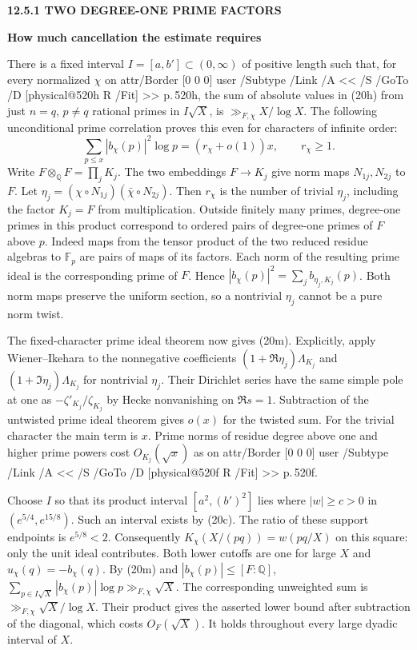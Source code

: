 \documentclass[11pt,letterpaper]{article}
\makeatletter
\newcommand{\rightmarktext}{}
\newcommand{\printfolio}{}
\newcommand{\leaf}[4]{\clearpage\gdef\printfolio{#1}\gdef\rightmarktext{#2}%
  {\small\sffamily\bfseries\color{ink}#3\par}\vspace{3pt}%
  {\LARGE\bfseries #4\par}\vspace{5pt}}
\newcommand{\Q}{\mathbb Q}
\newcommand{\MusicPDFPageRef}[1]{\pdfpageref\csname physical@#1\endcsname\space\space 0 R}
\newcommand{\pagelink}[2]{\leavevmode\pdfstartlink attr{/Border [0 0 0]} user{%
  /Subtype /Link /A << /S /GoTo /D [\MusicPDFPageRef{#1} /Fit] >>}%
  {\color{ink}#2}\pdfendlink}
\newcommand{\pg}[1]{\pagelink{#1}{p.\,#1}}
\makeatother
\begin{document}
\leaf{520i}{The absolute prime contribution}{12.5.1 \quad TWO DEGREE-ONE PRIME FACTORS}{How much cancellation the estimate requires}
There is a fixed interval $I=[a,b']\subset(0,\infty)$ of positive
length such that, for every normalized $\chi$ on \pg{520h}, the sum of
absolute values in (20h) from just $n=q$, $p\ne q$ rational primes in
$I\sqrt X$, is $\gg_{F,\chi} X/\log X$. The following unconditional
prime correlation proves this even for characters of infinite order:
\[
   \sum_{p\le x}|b_\chi(p)|^2\log p=(r_\chi+o(1))x,\qquad r_\chi\ge1 .
 \tag{20m}
\]
Write $F\otimes_\Q F=\prod_j K_j$. The two embeddings $F\to K_j$
give norm maps $N_{1j},N_{2j}$ to $F$. Let
$\eta_j=(\chi\circ N_{1j})(\bar\chi\circ N_{2j})$.
Then $r_\chi$ is the number of trivial $\eta_j$, including the
factor $K_j=F$ from multiplication. Outside finitely many primes,
degree-one primes in this product correspond to ordered pairs of
degree-one primes of $F$ above $p$. Indeed maps from the tensor
product of the two reduced residue algebras to $\mathbb F_p$ are
pairs of maps of its factors. Each norm of the resulting prime ideal
is the corresponding prime of $F$. Hence
$|b_\chi(p)|^2=\sum_j b_{\eta_j,K_j}(p)$. Both norm maps preserve the
uniform section, so a nontrivial $\eta_j$ cannot be a pure norm twist.

The fixed-character prime ideal theorem now gives (20m). Explicitly,
apply Wiener--Ikehara to the nonnegative coefficients
$(1+\Re\eta_j)\Lambda_{K_j}$ and $(1+\Im\eta_j)\Lambda_{K_j}$
for nontrivial $\eta_j$. Their Dirichlet series have the same simple
pole at one as $-\zeta'_{K_j}/\zeta_{K_j}$ by Hecke nonvanishing on
$\Re s=1$. Subtraction of the untwisted prime ideal theorem gives
$o(x)$ for the twisted sum. For the trivial character the main term is
$x$. Prime norms of residue degree above one and higher prime powers
cost $O_{K_j}(\sqrt x)$ as on \pg{520f}.

Choose $I$ so that its product interval $[a^2,(b')^2]$ lies where
$|w|\ge c>0$ in $(e^{5/4},e^{15/8})$. Such an interval exists by
(20c). The ratio of these support endpoints is $e^{5/8}<2$.
Consequently $K_\chi(X/(pq))=w(pq/X)$ on this square: only the unit
ideal contributes. Both lower cutoffs are one for large $X$ and
$u_\chi(q)=-b_\chi(q)$. By (20m) and $|b_\chi(p)|\le[F:\Q]$,
$\sum_{p\in I\sqrt X}|b_\chi(p)|\log p\gg_{F,\chi}\sqrt X$.
The corresponding unweighted sum is $\gg_{F,\chi}\sqrt X/\log X$.
Their product gives the asserted lower bound after subtraction of the
diagonal, which costs $O_F(\sqrt X)$. It holds throughout every large
dyadic interval of $X$.
\end{document}
